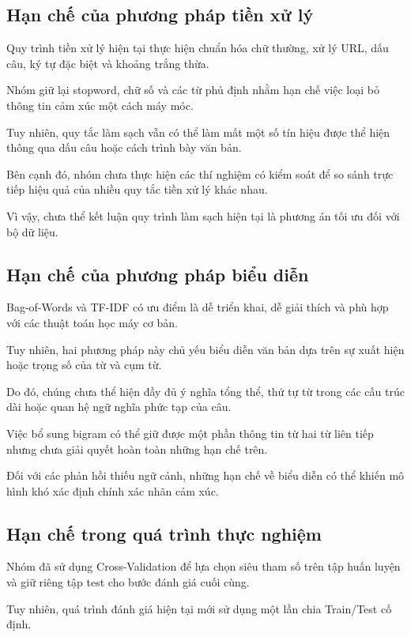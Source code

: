 \subsection{Hạn chế của phương pháp tiền xử lý}

Quy trình tiền xử lý hiện tại thực hiện
chuẩn hóa chữ thường, xử lý URL,
dấu câu, ký tự đặc biệt và khoảng
trắng thừa.

Nhóm giữ lại stopword, chữ số và các
từ phủ định nhằm hạn chế việc loại
bỏ thông tin cảm xúc một cách máy móc.

Tuy nhiên, quy tắc làm sạch vẫn có thể
làm mất một số tín hiệu được thể hiện
thông qua dấu câu hoặc cách trình bày
văn bản.

Bên cạnh đó, nhóm chưa thực hiện
các thí nghiệm có kiểm soát để so
sánh trực tiếp hiệu quả của nhiều
quy tắc tiền xử lý khác nhau.

Vì vậy, chưa thể kết luận quy trình
làm sạch hiện tại là phương án tối ưu
đối với bộ dữ liệu.


\subsection{Hạn chế của phương pháp biểu diễn}

Bag-of-Words và TF-IDF có ưu điểm
là dễ triển khai, dễ giải thích và
phù hợp với các thuật toán học máy
cơ bản.

Tuy nhiên, hai phương pháp này
chủ yếu biểu diễn văn bản dựa
trên sự xuất hiện hoặc trọng số
của từ và cụm từ.

Do đó, chúng chưa thể hiện đầy đủ
ý nghĩa tổng thể, thứ tự từ trong
các cấu trúc dài hoặc quan hệ
ngữ nghĩa phức tạp của câu.

Việc bổ sung bigram có thể giữ
được một phần thông tin từ hai
từ liên tiếp nhưng chưa giải quyết
hoàn toàn những hạn chế trên.

Đối với các phản hồi thiếu ngữ cảnh,
những hạn chế về biểu diễn có thể
khiến mô hình khó xác định chính
xác nhãn cảm xúc.


\subsection{Hạn chế trong quá trình thực nghiệm}

Nhóm đã sử dụng Cross-Validation
để lựa chọn siêu tham số trên tập
huấn luyện và giữ riêng tập test
cho bước đánh giá cuối cùng.

Tuy nhiên, quá trình đánh giá
hiện tại mới sử dụng một lần
chia Train/Test cố định.

